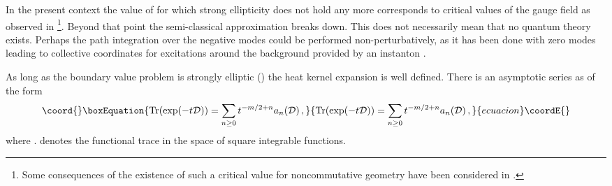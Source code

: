 \documentclass[a4paper,12pt]{article}
\begin{document}
In the present context the value of \myHighlight{$\Gamma$}\coordHE{} for which 
strong ellipticity does not hold any more corresponds to critical values
of the gauge field as observed in \cite{Nes}\footnote{Some 
consequences of the existence of such a critical value for 
noncommutative geometry have been considered in 
\cite{SST00,Klebanov00}.}. 
Beyond that point
the semi-classical approximation breaks down. This does not
necessarily mean that no quantum theory exists. Perhaps
the path integration over the negative modes could be performed
non-perturbatively, as it has been done with zero modes 
leading to collective coordinates for excitations around the 
background provided by an  instanton \cite{insttH,instO}.

As long as the boundary value problem is strongly elliptic
(\coordHE{}) the heat kernel expansion is well defined.
There is an asymptotic
series as \coordHE{} of the form 
\begin{equation}\coord{}\boxEquation{
{\textrm{Tr}}(\exp (-t{\cal D}))=
\sum _{n\geq 0}t^{-m/2+n}a_{n}({\cal D})\,,\label {asymp}
}{
{\textrm{Tr}}(\exp (-t{\cal D}))=
\sum _{n\geq 0}t^{-m/2+n}a_{n}({\cal D})\,,}{ecuacion}\coordE{}\end{equation}
 where \coordHE{}.   \coordHE{} denotes the functional
trace in the space of square integrable functions.
\end{document}
